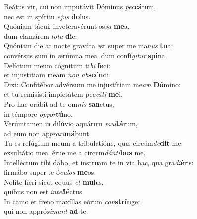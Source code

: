 \evenverse Beátus vir, cui non imputávit Dóminus \textit{pec}\textbf{cá}tum,~\*\\
\evenverse nec est in spíritu \textit{e}\textit{jus} \textbf{do}lus.\\
\oddverse Quóniam tácui, inveteravérunt os\textit{sa} \textbf{me}a,~\*\\
\oddverse dum clamárem \textit{to}\textit{ta} \textbf{di}e.\\
\evenverse Quóniam die ac nocte graváta est super me ma\textit{nus} \textbf{tu}a:~\*\\
\evenverse convérsus sum in ærúmna mea, dum confí\textit{gi}\textit{tur} \textbf{spi}na.\\
\oddverse Delíctum meum cógnitum ti\textit{bi} \textbf{fe}ci:~\*\\
\oddverse et injustítiam meam \textit{non} \textit{ab}\textbf{scón}di.\\
\evenverse Dixi: Confitébor advérsum me injustítiam me\textit{am} \textbf{Dó}mino:~\*\\
\evenverse et tu remisísti impietátem pec\textit{cá}\textit{ti} \textbf{me}i.\\
\oddverse Pro hac orábit ad te om\textit{nis} \textbf{san}ctus,~\*\\
\oddverse in témpore \textit{op}\textit{por}\textbf{tú}no.\\
\evenverse Verúmtamen in dilúvio aquárum \textit{mul}\textbf{tá}rum,~\*\\
\evenverse ad eum non ap\textit{pro}\textit{xi}\textbf{má}bunt.\\
\oddverse Tu es refúgium meum a tribulatióne, quæ circúm\textit{de}\textbf{dit} me:~\*\\
\oddverse exsultátio mea, érue me a circum\textit{dán}\textit{ti}\textbf{bus} me.\\
\evenverse Intelléctum tibi dabo, et ínstruam te in via hac, qua gra\textit{di}\textbf{é}ris:~\*\\
\evenverse firmábo super te ó\textit{cu}\textit{los} \textbf{me}os.\\
\oddverse Nolíte fíeri sicut equus \textit{et} \textbf{mu}lus,~\*\\
\oddverse quibus non est \textit{in}\textit{tel}\textbf{lé}ctus.\\
\evenverse In camo et freno maxíllas eórum \textit{con}\textbf{strín}ge:~\*\\
\evenverse qui non appró\textit{xi}\textit{mant} \textbf{ad} te.\\

